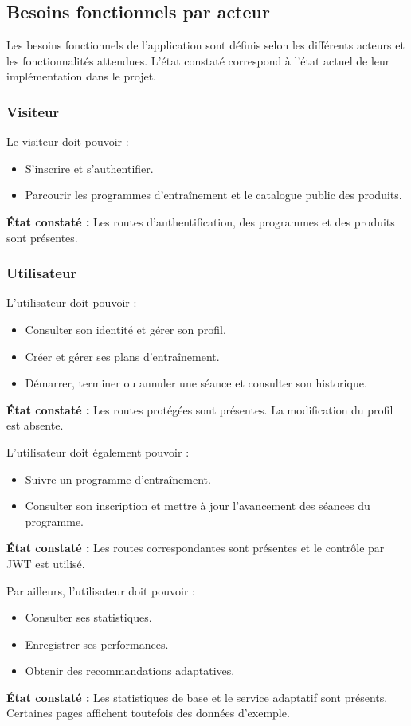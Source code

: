 ﻿\documentclass[12pt,a4paper]{report}
\begin{document}
\clearpage

\subsection{Besoins fonctionnels par acteur}
\label{c2-s1-sub2}
Les besoins fonctionnels de l'application sont définis selon les différents acteurs et les fonctionnalités attendues. L'état constaté correspond à l'état actuel de leur implémentation dans le projet.

\subsubsection{Visiteur}
Le visiteur doit pouvoir :
\begin{itemize}
    \item S'inscrire et s'authentifier.
    \item Parcourir les programmes d'entraînement et le catalogue public des produits.
\end{itemize}
\textbf{État constaté :} Les routes d'authentification, des programmes et des produits sont présentes.

\subsubsection{Utilisateur}

L'utilisateur doit pouvoir :
\begin{itemize}
    \item Consulter son identité et gérer son profil.
    \item Créer et gérer ses plans d'entraînement.
    \item Démarrer, terminer ou annuler une séance et consulter son historique.
\end{itemize}
\textbf{État constaté :} Les routes protégées sont présentes. La modification du profil est absente.

L'utilisateur doit également pouvoir :
\begin{itemize}
    \item Suivre un programme d'entraînement.
    \item Consulter son inscription et mettre à jour l'avancement des séances du programme.
\end{itemize}
\textbf{État constaté :} Les routes correspondantes sont présentes et le contrôle par JWT est utilisé.

Par ailleurs, l'utilisateur doit pouvoir :
\begin{itemize}
    \item Consulter ses statistiques.
    \item Enregistrer ses performances.
    \item Obtenir des recommandations adaptatives.
\end{itemize}
\textbf{État constaté :} Les statistiques de base et le service adaptatif sont présents. Certaines pages affichent toutefois des données d'exemple.
\end{document}
